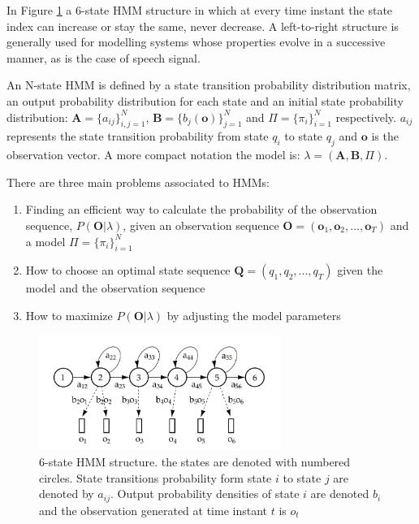 In Figure \ref{fig:hmm_structure} a 6-state HMM structure in which at every time instant the state index can increase or stay the same, never decrease. 
%
A left-to-right structure is generally used for modelling systems whose properties evolve in a successive manner, as is the case of speech signal.

An N-state HMM is defined by a state transition probability distribution matrix, an output probability distribution for each state and an initial state probability distribution: $\mathbf{A} = \lbrace a_{ij}\rbrace _{i,j=1}^{N}$, $\mathbf{B} = \lbrace b_{j}(\mathbf{o})\rbrace _{j=1}^{N}$ and $\Pi = \lbrace \pi _{i} \rbrace _{i=1}^{N}$ respectively.
% 
$a_{ij}$ represents the state transition probability from state $q_{i}$ to state $q_{j}$ and $\mathbf{o}$ is the observation vector. A more compact notation the model is: $\lambda = (\mathbf{A},\mathbf{B},\Pi)$.

There are three main problems associated to HMMs:
\begin{enumerate}
	\item Finding an efficient way to calculate the probability of the observation sequence, $P(\mathbf{O}|\lambda)$, given an observation sequence $\mathbf{O} = (\mathbf{o}_{1},\mathbf{o}_{2},...,\mathbf{o}_{T})$ and a model $\Pi = \lbrace \pi _{i} \rbrace _{i=1}^{N}$
	\item How to choose an optimal state sequence $\mathbf{Q} = (q_{1},q_{2},...,q_{T})$ given the model and the observation sequence
	\item How to maximize $P(\mathbf{O}|\lambda)$ by adjusting the model parameters
\end{enumerate}

\begin{figure}[!htb]
\begin{centering}
\includegraphics[width=0.7\textwidth]{images/hmm_structure.jpg}
\caption{6-state HMM structure. the states are denoted with numbered circles. State transitions probability form state $i$ to state $j$ are denoted by $a_{ij}$. Output probability densities of state $i$ are denoted $b_{i}$ and the observation generated at time instant $t$ is $o_{t}$ \cite{karjalainen1999kommunikaatioakustiikka}}
\label{fig:hmm_structure}
\end{centering}
\end{figure}

